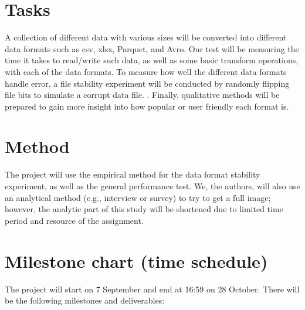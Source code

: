 \documentclass[12pt,twoside,english]{article}
\begin{document}
\section{Tasks}
\label{sect:tasks}
A collection of different data with various sizes will be converted into different data formats such as csv, xlsx, Parquet, and Avro. Our test will be measuring the time it takes to read/write such data, as well as some basic transform operations, with each of the data formats. To measure how well the different data formats handle error, a file stability experiment will be conducted by randomly flipping file bits to simulate a corrupt data file. \cite{blomer_quantitative_2018}. Finally, qualitative methods will be prepared to gain more insight into how popular or user friendly each format is.

\section{Method}
\label{sect:method}
The project will use the empirical method \cite{blomer_quantitative_2018} for the data format stability experiment, as well as the general performance test. We, the authors, will also use an analytical method (e.g., interview or survey) to try to get a full image; however, the analytic part of this study will be shortened due to limited time period and resource of the assignment. 

\section{Milestone chart (time schedule)}
\label{sect:milestones}
The project will start on 7 September and end at 16:59 on 28 October. There will be the following milestones and deliverables:
\end{document}
